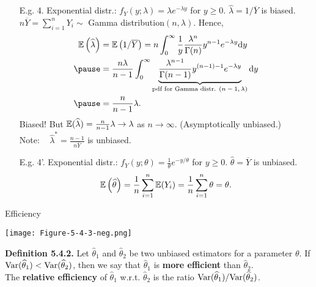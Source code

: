 \begin{frame}
\begin{enumerate}
 \item[E.g. 4.] Exponential distr.: $f_Y(y;\lambda)=\lambda e^{-\lambda y}$ for $y\ge 0$. $\widehat{\lambda}=1/\overline{Y}$ is biased.\\[1em] \pause
 $n\overline{Y} = \sum_{i=1}^n Y_i\sim$ Gamma distribution$(n,\lambda)$. \pause Hence,
 \begin{align*}
 \E\left(\widehat{\lambda}\right) &= \E\left(1/\overline{Y}\right) = n\int_0^\infty \frac{1}{y} \frac{\lambda^n}{\Gamma(n)}y^{n-1}e^{-\lambda y}\ud y \\
 \pause& = \frac{n \lambda }{n-1} \int_0^\infty  \underbrace{\frac{\lambda^{n-1}}{\Gamma(n-1)}y^{(n-1)-1}e^{-\lambda y}}_{\text{pdf for Gamma distr. $(n-1,\lambda)$}} \ud y\\
 \pause &= \frac{n}{n-1}\lambda .
 \end{align*}
 Biased! But $\mathbb{E}(\widehat\lambda) = \frac{n}{n-1}\lambda \rightarrow \lambda$ as $n\rightarrow\infty$. (Asymptotically unbiased.)\\[1em]\pause
 Note: ~ $\widehat\lambda^*= \frac{n-1}{n \overline{Y}}$ is unbiased.
 \vfill
 \pause
 \item[E.g. 4'.] Exponential distr.: $f_Y(y;\theta)=\frac{1}{\theta} e^{-y/\theta}$ for $y\ge 0$. $\widehat{\theta}=\overline{Y}$ is unbiased. \\[1em] \pause
\[
\mathbb{E}\left(\widehat{\theta}\right) = \frac{1}{n} \sum_{i=1}^n \mathbb{E}(Y_i) = \frac{1}{n} \sum_{i=1}^n \theta = \theta.
\]
 \end{enumerate}

\end{frame}
\begin{frame}{Efficiency}
 \begin{center}
 \texttt{[image: Figure-5-4-3-neg.png]}
\end{center}
 \vfill
 {\bf Definition 5.4.2.} Let $\widehat{\theta}_1$ and $\widehat{\theta}_2$ be two unbiased estimators for a parameter $\theta$. If $\text{Var}(\widehat{\theta}_1)<\text{Var}(\widehat{\theta}_2)$, then we say that $\widehat{\theta}_1$ is {\bf more efficient} than $\widehat{\theta}_2$.\\
 The {\bf relative efficiency} of $\widehat{\theta}_1$ w.r.t. $\widehat{\theta}_2$ is the ratio $\text{Var}(\widehat{\theta}_1)/\text{Var}(\widehat{\theta}_2)$.
\end{frame}
